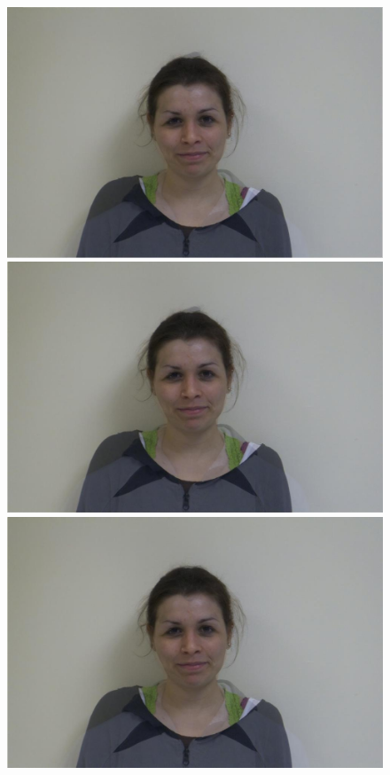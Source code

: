 \documentclass[11pt]{article}
\begin{document}
\begin{figure}[H]
\begin{center}
\includegraphics[scale=0.06]{figs/frames/morph_steinkirch_tangatur_16.jpg} 
\includegraphics[scale=0.06]{figs/frames/morph_steinkirch_tangatur_17.jpg} 
\includegraphics[scale=0.06]{figs/frames/morph_steinkirch_tangatur_18.jpg} 

\end{center}
\end{figure}
\end{document}

